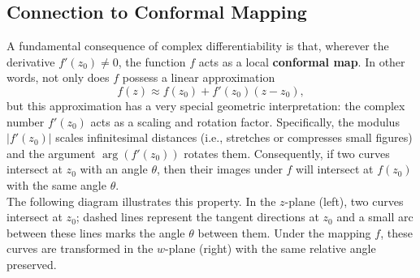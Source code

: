 \subsection*{Connection to Conformal Mapping} 

\noindent A fundamental consequence of complex differentiability is that, wherever the derivative \(f'(z_0)\neq 0\), the function \(f\) acts as a local \textbf{conformal map}. In other words, not only does \(f\) possess a linear approximation
\[
f(z) \approx f(z_0) + f'(z_0)(z - z_0),
\]
but this approximation has a very special geometric interpretation: the complex number \(f'(z_0)\) acts as a scaling and rotation factor. Specifically, the modulus \(|f'(z_0)|\) scales infinitesimal distances (i.e., stretches or compresses small figures) and the argument \(\arg(f'(z_0))\) rotates them. Consequently, if two curves intersect at \(z_0\) with an angle \(\theta\), then their images under \(f\) will intersect at \(f(z_0)\) with the same angle \(\theta\). \\

\noindent The following diagram illustrates this property. In the \(z\)-plane (left), two curves intersect at \(z_0\); dashed lines represent the tangent directions at \(z_0\) and a small arc between these lines marks the angle \(\theta\) between them. Under the mapping \(f\), these curves are transformed in the \(w\)-plane (right) with the same relative angle preserved.

